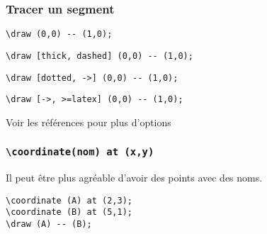 \documentclass{clic_latex_beamer}
\begin{document}
\begin{frame}[fragile]
\frametitle{Tracer un segment}


\begin{lstlisting}
\draw (0,0) -- (1,0);
\end{lstlisting}

\pause


\begin{lstlisting}
\draw [thick, dashed] (0,0) -- (1,0);
\end{lstlisting}


\begin{lstlisting}
\draw [dotted, ->] (0,0) -- (1,0);
\end{lstlisting}


\begin{lstlisting}
\draw [->, >=latex] (0,0) -- (1,0);
\end{lstlisting}

Voir les références pour plus d'options

\end{frame}

\begin{frame}[fragile]
\frametitle{\texttt{\textbackslash coordinate(nom) at (x,y)}}
Il peut être plus agréable d'avoir des points avec des noms.

\begin{lstlisting}
\coordinate (A) at (2,3);
\coordinate (B) at (5,1);
\draw (A) -- (B);
\end{lstlisting}

\pause



\end{frame}
\end{document}
